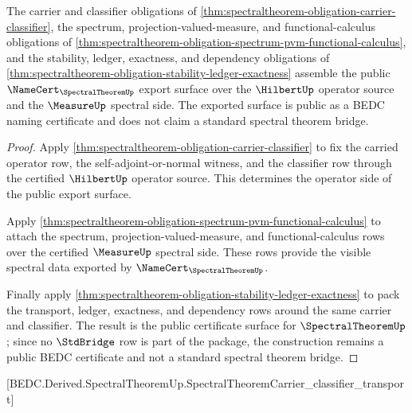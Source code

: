 \begin{theorem}
\label{thm:spectraltheorem-public-certificate}
The carrier and classifier obligations of \autoref{thm:spectraltheorem-obligation-carrier-classifier}, the spectrum, projection-valued-measure, and functional-calculus obligations of \autoref{thm:spectraltheorem-obligation-spectrum-pvm-functional-calculus}, and the stability, ledger, exactness, and dependency obligations of \autoref{thm:spectraltheorem-obligation-stability-ledger-exactness} assemble the public $\NameCert_{\SpectralTheoremUp}$ export surface over the $\HilbertUp$ operator source and the $\MeasureUp$ spectral side. The exported surface is public as a BEDC naming certificate and does not claim a standard spectral theorem bridge.
\end{theorem}
\begin{proof}
Apply \autoref{thm:spectraltheorem-obligation-carrier-classifier} to fix the carried operator row, the self-adjoint-or-normal witness, and the classifier row through the certified $\HilbertUp$ operator source. This determines the operator side of the public export surface.

Apply \autoref{thm:spectraltheorem-obligation-spectrum-pvm-functional-calculus} to attach the spectrum, projection-valued-measure, and functional-calculus rows over the certified $\MeasureUp$ spectral side. These rows provide the visible spectral data exported by $\NameCert_{\SpectralTheoremUp}$.

Finally apply \autoref{thm:spectraltheorem-obligation-stability-ledger-exactness} to pack the transport, ledger, exactness, and dependency rows around the same carrier and classifier. The result is the public certificate surface for $\SpectralTheoremUp$; since no $\StdBridge$ row is part of the package, the construction remains a public BEDC certificate and not a standard spectral theorem bridge.
\end{proof}

[BEDC.Derived.SpectralTheoremUp.SpectralTheoremCarrier\_classifier\_transport]

